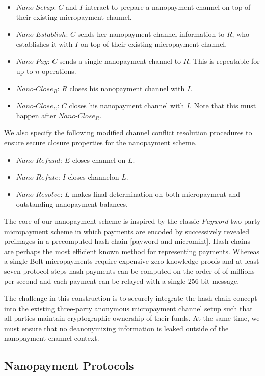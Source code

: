 \begin{itemize}
\item $Nano$-$Setup$: $C$ and $I$ interact to prepare a nanopayment channel on top
  of their existing micropayment channel.
\item $Nano$-$Establish$: $C$ sends her nanopayment channel information to $R$,
  who establishes it with $I$ on top of their existing micropayment channel.
\item $Nano$-$Pay$: $C$ sends a single nanopayment channel to $R$. This is
  repeatable for up to $n$ operations.
\item $Nano$-$Close_R$: $R$ closes his nanopayment channel with $I$.
\item $Nano$-$Close_C$: $C$ closes his nanopayment channel with $I$. Note that
  this must happen after $Nano$-$Close_R$.
\end{itemize}

We also specify the following modified channel conflict resolution procedures to
ensure secure closure properties for the nanopayment scheme.

\begin{itemize}
\item $Nano$-$Refund$: $E$ closes channel on $L$.
\item $Nano$-$Refute$: $I$ closes channelon $L$.
\item $Nano$-$Resolve$: $L$ makes final determination on both micropayment and
  outstanding nanopayment balances.
\end{itemize}

The core of our nanopayment scheme is inspired by the classic \emph{Payword}
two-party micropayment scheme in which payments are encoded by successively
revealed preimages in a precomputed hash chain [payword and micromint]. Hash
chains are perhaps the most efficient known method for representing
payments. Whereas a single Bolt micropayments require expensive zero-knowledge
proofs and at least seven protocol steps hash payments can be computed on the
order of of millions per second and each payment can be relayed with a single
256 bit message.

The challenge in this construction is to securely integrate the hash chain
concept into the existing three-party anonymous micropayment channel setup such
that all parties maintain cryptographic ownership of their funds. At the same
time, we must ensure that no deanonymizing information is leaked outside of the
nanopayment channel context.

\subsection{Nanopayment Protocols}

